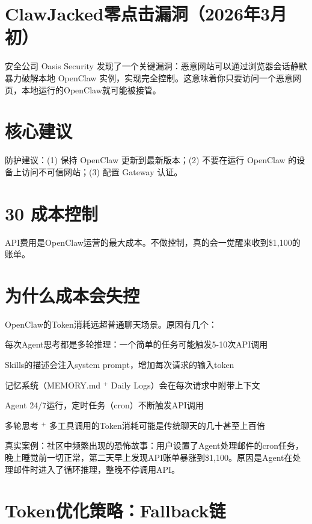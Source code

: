 \documentclass[
  10
]{article}
\begin{document}
\section{ClawJacked零点击漏洞（2026年3月初）}\label{clawjackedux96f6ux70b9ux51fbux6f0fux6d1e2026ux5e743ux6708ux521d}

安全公司 Oasis Security
发现了一个关键漏洞：恶意网站可以通过浏览器会话静默暴力破解本地 OpenClaw
实例，实现完全控制。这意味着你只要访问一个恶意网页，本地运行的OpenClaw就可能被接管。

\section{核心建议}\label{ux6838ux5fc3ux5efaux8bae-21}

防护建议：(1) 保持 OpenClaw 更新到最新版本；(2) 不要在运行 OpenClaw
的设备上访问不可信网站；(3) 配置 Gateway 认证。

\section{30 成本控制}\label{ux6210ux672cux63a7ux5236}

API费用是OpenClaw运营的最大成本。不做控制，真的会一觉醒来收到\$1,100的账单。

\section{为什么成本会失控}\label{ux4e3aux4ec0ux4e48ux6210ux672cux4f1aux5931ux63a7}

OpenClaw的Token消耗远超普通聊天场景。原因有几个：

每次Agent思考都是多轮推理：一个简单的任务可能触发5-10次API调用

Skills的描述会注入system prompt，增加每次请求的输入token

记忆系统（MEMORY.md \(^ +\) Daily Logs）会在每次请求中附带上下文

Agent 24/7运行，定时任务（cron）不断触发API调用

多轮思考 \(^ +\) 多工具调用的Token消耗可能是传统聊天的几十甚至上百倍

真实案例：社区中频繁出现的恐怖故事：用户设置了Agent处理邮件的cron任务，晚上睡觉前一切正常，第二天早上发现API账单暴涨到\$1,100。原因是Agent在处理邮件时进入了循环推理，整晚不停调用API。

\section{Token优化策略：Fallback链}\label{tokenux4f18ux5316ux7b56ux7565fallbackux94fe}
\end{document}
